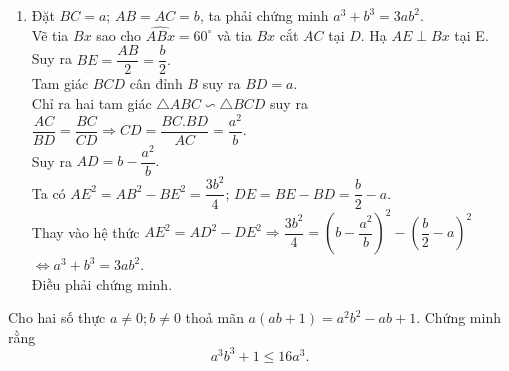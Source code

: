 \begin{ex}
{\begin{enumerate}[1)]
b) Đường thẳng $CI$ cắt đường tròn $(I)$ tại $Q$, đường thẳng $NO$ cắt $CQ$ tại $K$.\\
Vì $\widehat{BAN}=\widehat{NAC}$ (vì $AN$ là tia phân giác của góc $\widehat{BAC}$) nên $BN=CN$.\\
Mặt khác: $OB=OC$ (cùng bằng bán kính) suy ra $ON$ là đường trung trực của $BC$ hay $NK \perp BC$.\\
$\widehat{QMC}=90^\circ$ (góc nội tiếp chắn nửa đường tròn đường kính $QC$) suy ra $QM \perp BC$.\\
Từ đó suy ra $QM \parallel KN$ $\Rightarrow \widehat{MQC}=\widehat{NKC}$ (Hai góc ở vị trí đồng vị)  (3).\\
Trong $(I)$: $\widehat{MQC}=\widehat{MAC}$ (Hai góc nội tiếp chắn cung MC)  (4).\\
Từ $(3)$ và $(4)$ suy ra $\widehat{NKC}=\widehat{MAC}$ hay $\widehat{NKC}=\widehat{NAC}$.\\
Từ đó suy ra bốn điểm $N$, $A$, $K$, $C$ cùng thuộc đường tròn $(O)$. \\
Mà đường kính $NK$ của $(O)$ vuông góc với $BC$ nên $K$ cố định. 

\item 
Đặt $BC=a$; $AB=AC=b$, ta phải chứng minh $a^3+b^3=3ab^2$.\\
Vẽ tia $Bx$ sao cho $\widehat{ABx}=60^\circ$ và tia $Bx$ cắt $AC$ tại $D$. Hạ $AE \perp Bx$ tại E. \\
Suy ra $BE=\dfrac{AB}{2}=\dfrac{b}{2}.$\\
Tam giác $BCD$ cân đỉnh $B$ suy ra $BD=a$.\\ 
Chỉ ra hai tam giác $\triangle ABC \backsim \triangle BCD$ suy ra $\dfrac{AC}{BD}=\dfrac{BC}{CD}\Rightarrow CD=\dfrac{BC. BD}{AC}=\dfrac{a^2}{b}.$\\
Suy ra $AD=b-\dfrac{a^2}{b}.$\\
Ta có $AE^2=AB^2-BE^2=\dfrac{3b^2}{4}$; $DE=BE-BD=\dfrac{b}{2}-a$.\\
Thay vào hệ thức $AE^2=AD^2-DE^2\Rightarrow \dfrac{3b^2}{4}=\left(b-\dfrac{a^2}{b}\right)^2-\left(\dfrac{b}{2}-a\right)^2$
$\Leftrightarrow a^3+b^3=3ab^2$.\\ Điều phải chứng minh.
\end{enumerate}
}
\end{ex}


\begin{ex}%
Cho hai số thực $a\ne 0; b\ne 0$ thoả mãn $a(ab+1)=a^2b^2-ab+1$. Chứng minh rằng 
$$a^3b^3+1\le 16a^3.$$
\end{ex}

